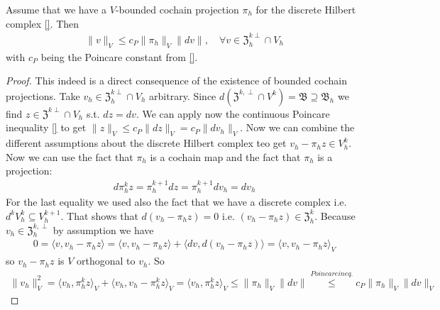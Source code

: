 \documentclass[../master_thesis.tex]{subfiles}
\begin{document}
\begin{proposition}
    Assume that we have a $V$-bounded cochain projection $\pi_h$ for 
    the discrete Hilbert complex \ref{}. Then 
    \begin{align*}
        \lVert v \rVert _V \leq c_P \lVert \pi_h \rVert _V \lVert dv \rVert, 
            \quad \forall v \in \mathfrak{Z}_h^{k\perp}\cap V_h
    \end{align*}
    with $c_P$ being the Poincare constant from \ref{}.
\end{proposition}
\begin{proof}
    This indeed is a direct consequence of the existence of bounded cochain projections.
    Take $v_h \in \mathfrak{Z}_h^{k\perp}\cap V_h$ arbitrary. 
    Since $d (\mathfrak{Z}^{k,\perp} \cap V^k) = \mathfrak{B} \supseteq \mathfrak{B}_h$ we find 
    $z\in \mathfrak{Z}^{k\perp}\cap V_h$ s.t. $dz = dv$. We can apply now the continuous 
    Poincare inequality \ref{} to get $\lVert z \rVert _V \leq c_P \lVert dz \rVert _V = c_P \lVert dv_h \rVert _V$.
    Now we can combine the different assumptions about the discrete Hilbert complex teo get 
    $v_h - \pi_h z \in V_h^k$. Now we can use the fact that $\pi_h$ is a cochain map 
    and the fact that $\pi_h$ is a projection:
    \begin{align*}
        d\pi^k_h z = \pi^{k+1}_h dz = \pi^{k+1}_h dv_h = dv_h
    \end{align*}
    For the last equality we used also the fact that we have a discrete complex i.e. $d^k V^k_h \subseteq V^{k+1}_h$.
    That shows that $d(v_h - \pi_h z) = 0$ i.e. $(v_h - \pi_h z) \in \mathfrak{Z}_h^k$.
    Because $v_h \in \mathfrak{Z}_h^{k,\perp}$ by assumption we have 
    \begin{align*}
        0 = \langle v, v_h - \pi_h z \rangle = \langle v, v_h - \pi_h z \rangle + \langle dv, d(v_h - \pi_h z) \rangle
            = \langle v, v_h - \pi_h z \rangle _V
    \end{align*}
    so $v_h - \pi_h z$ is $V$ orthogonal to $v_h$. So 
    \begin{align*}
        \lVert v_h \rVert _V^2 = \langle v_h, \pi_h^k z \rangle _V + \langle v_h, v_h - \pi_h^k z\rangle _V 
        = \langle v_h, \pi_h^k z \rangle _V \leq \lVert \pi_h \rVert _V \lVert dv \rVert
        \stackrel{Poincare ineq.}{\leq} c_P \lVert \pi_h \rVert _V \lVert dv \rVert _V
    \end{align*}
\end{proof}
\end{document}
